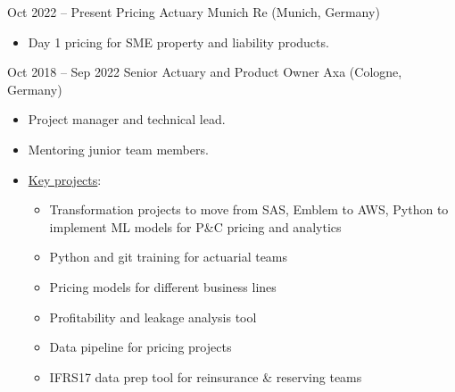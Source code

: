 \documentclass[a4paper,]{fortysecondscv}
\begin{document}
\begin{cvtable}%

    \vspace{\topsep}
    \cvitem
    {Oct 2022 -- Present}
    {Pricing Actuary}
    {Munich Re (Munich, Germany)}
    {
        \vspace{-\topsep}
        \begin{itemize}[nosep, leftmargin=0pt] %
            \item Day 1 pricing for SME property and liability products.
        \end{itemize}
    }

    \vspace{\topsep}
    \cvitem
    {Oct 2018 -- Sep 2022}
    {Senior Actuary and Product Owner}
    {Axa (Cologne, Germany)}
    {
        \vspace{-\topsep}
        \begin{itemize}[nosep, leftmargin=0pt] %
            \item Project manager and technical lead.
            \item Mentoring junior team members.
            \item \underline{Key projects}:
                  \begin{itemize}
                      \item Transformation projects to move from SAS, Emblem to AWS, Python to implement ML models for P\&C pricing and analytics
                      \item Python and git training for actuarial teams
                      \item Pricing models for different business lines
                      \item Profitability and leakage analysis tool
                      \item Data pipeline for pricing projects
                      \item IFRS17 data prep tool for reinsurance \& reserving teams
                  \end{itemize}

\end{itemize}}
\end{cvtable}
\end{document}
